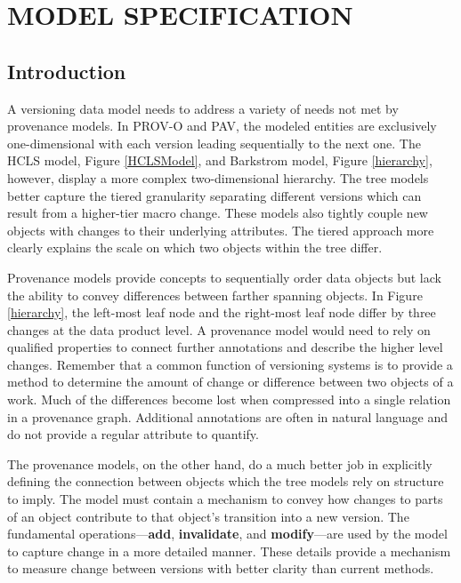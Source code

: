 
\chapter{MODEL SPECIFICATION}\label{ch:model}

\section{Introduction}

A versioning data model needs to address a variety of needs not met by provenance models.
In PROV-O and PAV, the modeled entities are exclusively one-dimensional with each version leading sequentially to the next one.
The HCLS model, Figure \ref{HCLSModel}, and Barkstrom model, Figure \ref{hierarchy}, however, display a more complex two-dimensional hierarchy.
The tree models better capture the tiered granularity separating different versions which can result from a higher-tier macro change.
These models also tightly couple new objects with changes to their underlying attributes.
The tiered approach more clearly explains the scale on which two objects within the tree differ.

Provenance models provide concepts to sequentially order data objects but lack the ability to convey differences between farther spanning objects.
In Figure \ref{hierarchy}, the left-most leaf node and the right-most leaf node differ by three changes at the data product level.
A provenance model would need to rely on qualified properties to connect further annotations and describe the higher level changes.
Remember that a common function of versioning systems is to provide a method to determine the amount of change or difference between two objects of a work.
Much of the differences become lost when compressed into a single relation in a provenance graph.
Additional annotations are often in natural language and do not provide a regular attribute to quantify.

The provenance models, on the other hand, do a much better job in explicitly defining the connection between objects which the tree models rely on structure to imply.
The model must contain a mechanism to convey how changes to parts of an object contribute to that object's transition into a new version.
The fundamental operations---\textbf{add}, \textbf{invalidate}, and \textbf{modify}---are used by the model to capture change in a more detailed manner.
These details provide a mechanism to measure change between versions with better clarity than current methods.

